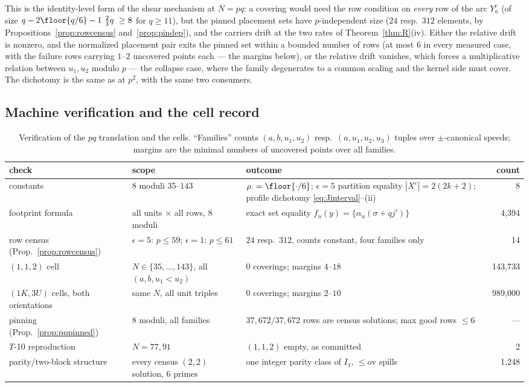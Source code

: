 This is the identity-level form of the shear mechanism at $N=pq$: a covering
would need the row condition on \emph{every} row of the arc $Y_a^{c}$ (of
size $q-2\floor{q/6}-1\ \tfrac23 q\ \ge 8$ for $q\ge11$), but the pinned
placement sets have $p$-independent size ($24$ resp.\ $312$ elements, by
Propositions~\ref{prop:rowcensus} and~\ref{prop:pindep}), and the carriers
drift at the two rates of Theorem~\ref{thm:R}(iv). Either the relative drift
is nonzero, and the normalized placement pair exits the pinned set within a
bounded number of rows (at most $6$ in every measured case, with the failure
rows carrying $1$--$2$ uncovered points each --- the margins below), or the
relative drift vanishes, which forces a multiplicative relation between
$u_1,u_2$ modulo $p$ --- the collapse case, where the family degenerates to a
common scaling and the kernel side must cover. The dichotomy is the same as
at $p^2$, with the same two consumers.

\subsection{Machine verification and the cell record}\label{sec:pq-verify}

\begin{table}[t]
\centering
\small
\caption{Verification of the $pq$ translation and the cells. ``Families''
counts $(a,b,u_1,u_2)$ resp.\ $(a,u_1,u_2,u_3)$ tuples over $\pm$-canonical
speeds; margins are the minimal numbers of uncovered points over all
families.}
\label{tab:pqverify}
\begin{tabularx}{\textwidth}{@{}lXXr@{}}
\toprule
check & scope & outcome & count \\
\midrule
constants & $8$ moduli $35$--$143$ & $\rho_\cdot=\floor{\cdot/6}$;
$\epsilon{=}5$ partition equality $|X^c|=2(2k{+}2)$; profile dichotomy
\eqref{eq:Jinterval}--(ii) & 8 \\
footprint formula & all units $\times$ all rows, $8$ moduli & exact set
equality $f_u(y)=\{\alpha_u(\sigma+qj')\}$ & 4{,}394 \\
row census (Prop.~\ref{prop:rowcensus}) & $\epsilon=5$: $p\le59$;
$\epsilon=1$: $p\le61$ & $24$ resp.\ $312$, counts constant, four families
only & 14 \\
$(1,1,2)$ cell & $N\in\{35,\dots,143\}$, all $(a,b,u_1<u_2)$ & $0$
coverings; margins $4$--$18$ & 143{,}733 \\
$(1K,3U)$ cells, both orientations & same $N$, all unit triples & $0$
coverings; margins $2$--$10$ & 989{,}000 \\
pinning (Prop.~\ref{prop:pqpinned}) & $8$ moduli, all families & $37{,}672/
37{,}672$ rows are census solutions; max good rows $\le6$ & --- \\
$T$-10 reproduction & $N=77,91$ & $(1,1,2)$ empty, as committed & 2 \\
parity/two-block structure & every census $(2,2)$ solution, $6$ primes &
one integer parity class of $I_1$, $\le\mathrm{ov}$ spills & 1{,}248 \\
\bottomrule
\end{tabularx}
\end{table}

